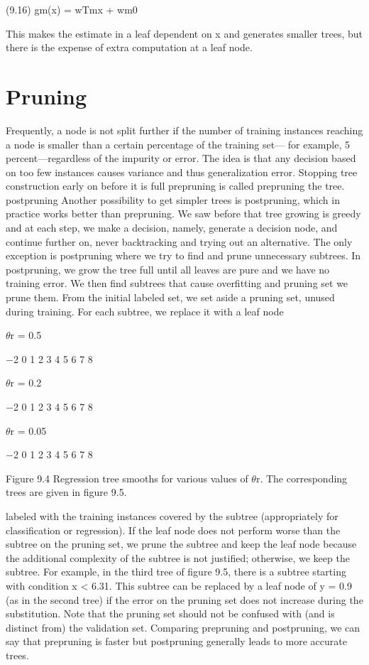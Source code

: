(9.16) gm(x) = wTmx + wm0

This makes the estimate in a leaf dependent on x and generates smaller trees, but there is the expense of extra computation at a leaf node.

\section{Pruning}

Frequently, a node is not split further if the number of training instances reaching a node is smaller than a certain percentage of the training set--- for example, 5 percent---regardless of the impurity or error. The idea is that any decision based on too few instances causes variance and thus generalization error. Stopping tree construction early on before it is full prepruning is called prepruning the tree. postpruning Another possibility to get simpler trees is postpruning, which in practice works better than prepruning. We saw before that tree growing is greedy and at each step, we make a decision, namely, generate a decision node, and continue further on, never backtracking and trying out an alternative. The only exception is postpruning where we try to find and prune unnecessary subtrees. In postpruning, we grow the tree full until all leaves are pure and we have no training error. We then find subtrees that cause overfitting and pruning set we prune them. From the initial labeled set, we set aside a pruning set, unused during training. For each subtree, we replace it with a leaf node

$\theta$r = 0.5

$-$2 0 1 2 3 4 5 6 7 8

$\theta$r = 0.2

$-$2 0 1 2 3 4 5 6 7 8

$\theta$r = 0.05

$-$2 0 1 2 3 4 5 6 7 8

Figure 9.4 Regression tree smooths for various values of $\theta$r. The corresponding trees are given in figure 9.5.

labeled with the training instances covered by the subtree (appropriately for classification or regression). If the leaf node does not perform worse than the subtree on the pruning set, we prune the subtree and keep the leaf node because the additional complexity of the subtree is not justified; otherwise, we keep the subtree. For example, in the third tree of figure 9.5, there is a subtree starting with condition x < 6.31. This subtree can be replaced by a leaf node of y = 0.9 (as in the second tree) if the error on the pruning set does not increase during the substitution. Note that the pruning set should not be confused with (and is distinct from) the validation set. Comparing prepruning and postpruning, we can say that prepruning is faster but postpruning generally leads to more accurate trees.


